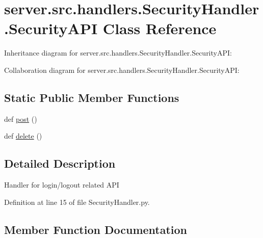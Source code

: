 \hypertarget{classserver_1_1src_1_1handlers_1_1_security_handler_1_1_security_a_p_i}{}\section{server.\+src.\+handlers.\+Security\+Handler.\+Security\+A\+PI Class Reference}
\label{classserver_1_1src_1_1handlers_1_1_security_handler_1_1_security_a_p_i}


Inheritance diagram for server.\+src.\+handlers.\+Security\+Handler.\+Security\+A\+PI\+:


Collaboration diagram for server.\+src.\+handlers.\+Security\+Handler.\+Security\+A\+PI\+:
\subsection*{Static Public Member Functions}
\begin{DoxyCompactItemize}
\item 
def \hyperlink{classserver_1_1src_1_1handlers_1_1_security_handler_1_1_security_a_p_i_a54e89643d6b5afad1ccd436ed784898b}{post} ()
\item 
def \hyperlink{classserver_1_1src_1_1handlers_1_1_security_handler_1_1_security_a_p_i_a8118b464bf5953e799f6734f661d8dc0}{delete} ()
\end{DoxyCompactItemize}


\subsection{Detailed Description}
\begin{DoxyVerb}Handler for login/logout related API\end{DoxyVerb}
 

Definition at line 15 of file Security\+Handler.\+py.



\subsection{Member Function Documentation}
